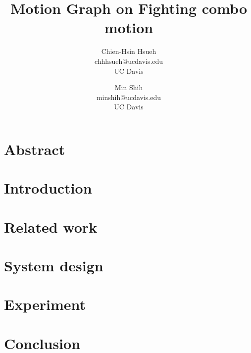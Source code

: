\documentclass[twocolumn, 11pt]{article}  %
\newcommand*{\TitleFont}{%
      \usefont{\encodingdefault}{\rmdefault}{b}{n}%
      \fontsize{16}{20}%
      \selectfont}
\begin{document}

\title{\TitleFont Motion Graph on Fighting combo motion}
\author{Chien-Hsin Hsueh\\chhhsueh@ucdavis.edu\\UC Davis }
\author{Min Shih\\minshih@ucdavis.edu\\UC Davis }
\maketitle



\section{Abstract}


\section{Introduction}


\section{Related work}



\section{System design}


\section{Experiment}


\section{Conclusion}

\end{document}
